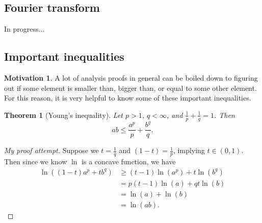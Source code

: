 \documentclass[11pt]{article}
\newtheorem{theorem}{Theorem}
\theoremstyle{definition}
\newtheorem*{motivation}{Motivation}
\begin{document}
\subsection{Fourier transform}
In progress...

\newpage

\subsection{Important inequalities}
\begin{motivation}
A lot of analysis proofs in general can be boiled down to figuring out if some element is smaller than, bigger than, or equal to some other element.
For this reason, it is very helpful to know some of these important inequalities. 
\end{motivation}
\begin{theorem}[Young's inequality]
Let $p > 1$, $q < \infty$, and $\frac{1}{p}+\frac{1}{q} = 1$. Then
\[ab \leq \frac{a^p}{p} + \frac{b^q}{q}.\]
\end{theorem}
\begin{proof}[My proof attempt]
Suppose we $t = \frac{1}{q}$ and $(1-t)=\frac{1}{p}$, implying $t \in (0,1)$. Then since we know $\ln$ is a concave function, we have
	\begin{equation*}
		\begin{aligned}
			\ln{((1-t)a^p + tb^q)} &\geq (t-1)\ln{(a^p)} + t\ln{(b^q)} \\
					       &= p(t-1)\ln{(a)} + qt\ln{(b)} \\
					       &= \ln{(a)} + \ln{(b)} \\
					       &= \ln{(ab)}.
		\end{aligned}
	\end{equation*}
\end{proof}
\end{document}
